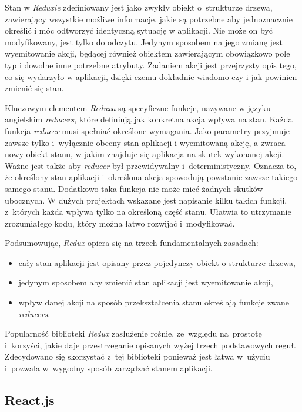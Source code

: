 \documentclass[12pt,a4paper,polish,thesis]{dcsbook}
\begin{document}
{	Stan w \textit{Reduxie} zdefiniowany jest jako zwykły obiekt o~strukturze drzewa, zawierający wszystkie możliwe informacje, jakie są potrzebne aby jednoznacznie określić i móc odtworzyć identyczną sytuację w aplikacji. Nie może on być modyfikowany, jest tylko do odczytu. Jedynym sposobem na jego zmianę jest wyemitowanie akcji, będącej również obiektem zawierającym obowiązkowo pole typ i dowolne inne potrzebne atrybuty. Zadaniem akcji jest przejrzysty opis tego, co się wydarzyło w aplikacji, dzięki czemu dokładnie wiadomo czy i jak powinien zmienić się stan.

	Kluczowym elementem \textit{Reduxa} są specyficzne funkcje, nazywane w języku angielskim \textit{reducers}, które definiują jak konkretna akcja wpływa na stan. Każda funkcja \textit{reducer} musi spełniać określone wymagania. Jako parametry przyjmuje zawsze tylko i~wyłącznie obecny stan aplikacji i wyemitowaną akcję, a zwraca nowy obiekt stanu, w jakim znajduje się aplikacja na skutek wykonanej akcji. Ważne jest także aby \textit{reducer} był przewidywalny i~deterministyczny. Oznacza to, że określony stan aplikacji i~określona akcja spowodują powstanie zawsze takiego samego stanu. Dodatkowo taka funkcja nie może mieć żadnych skutków ubocznych. W dużych projektach wskazane jest napisanie kilku takich funkcji, z~których każda wpływa tylko na określoną część stanu. Ułatwia to utrzymanie zrozumiałego kodu, który można łatwo rozwijać i~modyfikować.

	Podsumowując, \textit{Redux} opiera się na trzech fundamentalnych zasadach:
	\begin{itemize}
		\item cały stan aplikacji jest opisany przez pojedynczy obiekt o strukturze drzewa,
		\item jedynym sposobem aby zmienić stan aplikacji jest wyemitowanie akcji,
		\item wpływ danej akcji na sposób przekształcenia stanu określają funkcje zwane \textit{reducers}.
	\end{itemize}

	Popularność biblioteki \textit{Redux} zasłużenie rośnie, ze~względu na~prostotę i~korzyści, jakie daje przestrzeganie opisanych wyżej trzech podstawowych reguł. Zdecydowano się skorzystać z~tej biblioteki ponieważ jest łatwa w~użyciu i~pozwala w~wygodny sposób zarządzać stanem aplikacji.

	\subsection{React.js}

}
\end{document}
